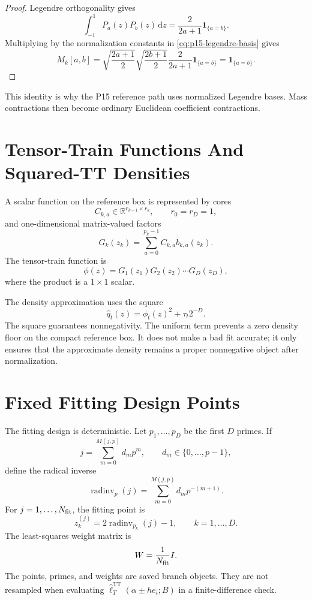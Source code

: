 \documentclass[11pt]{article}
\newcommand{\R}{\mathbb{R}}
\newcommand{\dd}{\mathrm{d}}
\newcommand{\TT}{\mathrm{TT}}
\newcommand{\radinv}{\operatorname{radinv}}
\theoremstyle{definition}
\theoremstyle{remark}
\renewcommand{\[}{\begin{equation}}
\renewcommand{\]}{\end{equation}}
\begin{document}
\begin{proof}
Legendre orthogonality gives
\[
  \int_{-1}^{1}P_a(z)P_b(z)\,\dd z
  =
  \frac{2}{2a+1}\mathbf 1_{\{a=b\}}.
\]
Multiplying by the normalization constants in \eqref{eq:p15-legendre-basis}
gives
\[
  M_k[a,b]
  =
  \sqrt{\frac{2a+1}{2}}\sqrt{\frac{2b+1}{2}}
  \frac{2}{2a+1}\mathbf 1_{\{a=b\}}
  =
  \mathbf 1_{\{a=b\}}.
\]
\end{proof}

This identity is why the P15 reference path uses normalized Legendre bases.
Mass contractions then become ordinary Euclidean coefficient contractions.

\section{Tensor-Train Functions And Squared-TT Densities}

A scalar function on the reference box is represented by cores
\[
  C_{k,a}\in\R^{r_{k-1}\times r_k},\qquad r_0=r_D=1,
  \label{eq:p15-core-coefficients}
\]
and one-dimensional matrix-valued factors
\[
  G_k(z_k)=\sum_{a=0}^{p_k-1}C_{k,a}b_{k,a}(z_k).
  \label{eq:p15-G-factor}
\]
The tensor-train function is
\[
  \phi(z)=G_1(z_1)G_2(z_2)\cdots G_D(z_D),
  \label{eq:p15-tt-function}
\]
where the product is a \(1\times1\) scalar.

The density approximation uses the square
\[
  \widehat q_t(z)=\phi_t(z)^2+\tau_t2^{-D}.
  \label{eq:p15-square-density}
\]
The square guarantees nonnegativity.  The uniform term prevents a zero density
floor on the compact reference box.  It does not make a bad fit accurate; it
only ensures that the approximate density remains a proper nonnegative object
after normalization.

\section{Fixed Fitting Design Points}

The fitting design is deterministic.  Let \(p_1,\ldots,p_D\) be the first
\(D\) primes.  If
\[
  j=\sum_{m=0}^{M(j,p)}d_m p^m,\qquad d_m\in\{0,\ldots,p-1\},
\]
define the radical inverse
\[
  \radinv_p(j)=\sum_{m=0}^{M(j,p)}d_m p^{-(m+1)}.
  \label{eq:p15-radinv}
\]
For \(j=1,\ldots,N_{\rm fit}\), the fitting point is
\[
  z_k^{(j)}=2\radinv_{p_k}(j)-1,\qquad k=1,\ldots,D.
  \label{eq:p15-halton}
\]
The least-squares weight matrix is
\[
  W=\frac1{N_{\rm fit}}I.
  \label{eq:p15-uniform-W}
\]
The points, primes, and weights are saved branch objects.  They are not
resampled when evaluating \(\widehat\ell_T^{\TT}(\alpha\pm h e_i;B)\) in a
finite-difference check.
\end{document}
